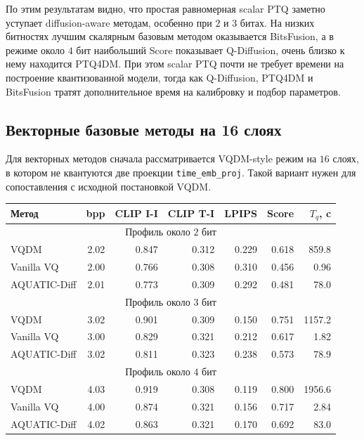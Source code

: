 \documentclass[a4paper,12pt]{article}
\begin{document}
По этим результатам видно, что простая равномерная scalar PTQ заметно уступает diffusion-aware методам, особенно при $2$ и $3$ битах. На низких битностях лучшим скалярным базовым методом оказывается BitsFusion, а в режиме около $4$ бит наибольший Score показывает Q-Diffusion, очень близко к нему находится PTQ4DM. При этом scalar PTQ почти не требует времени на построение квантизованной модели, тогда как Q-Diffusion, PTQ4DM и BitsFusion тратят дополнительное время на калибровку и подбор параметров.

\subsection{Векторные базовые методы на 16 слоях}

Для векторных методов сначала рассматривается VQDM-style режим на $16$ слоях, в котором не квантуются две проекции \texttt{time\_emb\_proj}. Такой вариант нужен для сопоставления с исходной постановкой VQDM.

\begin{center}
\small
\begin{tabular}{lrrrrrr}
\hline
Метод & bpp & CLIP I-I & CLIP T-I & LPIPS & Score & $T_q$, c \\
\hline
\multicolumn{7}{c}{Профиль около $2$ бит} \\
\hline
VQDM & 2.02 & 0.847 & 0.312 & 0.229 & 0.618 & 859.8 \\
Vanilla VQ & 2.00 & 0.766 & 0.308 & 0.310 & 0.456 & 0.96 \\
AQUATIC-Diff & 2.01 & 0.773 & 0.309 & 0.292 & 0.481 & 78.0 \\
\hline
\multicolumn{7}{c}{Профиль около $3$ бит} \\
\hline
VQDM & 3.02 & 0.901 & 0.309 & 0.150 & 0.751 & 1157.2 \\
Vanilla VQ & 3.00 & 0.829 & 0.321 & 0.212 & 0.617 & 1.82 \\
AQUATIC-Diff & 3.02 & 0.811 & 0.323 & 0.238 & 0.573 & 78.9 \\
\hline
\multicolumn{7}{c}{Профиль около $4$ бит} \\
\hline
VQDM & 4.03 & 0.919 & 0.308 & 0.119 & 0.800 & 1956.6 \\
Vanilla VQ & 4.00 & 0.874 & 0.321 & 0.156 & 0.717 & 2.84 \\
AQUATIC-Diff & 4.02 & 0.863 & 0.321 & 0.170 & 0.692 & 83.0 \\
\hline
\end{tabular}
\end{center}
\end{document}
